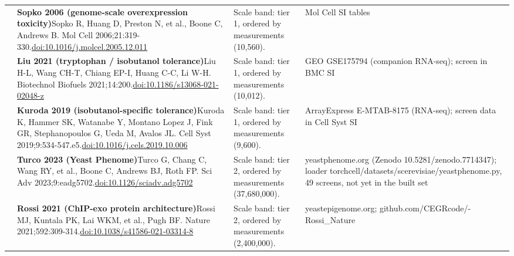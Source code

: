 \begin{landscape}
\begin{longtable}{@{}r@{\hspace{4pt}} L{86mm} L{92mm} L{62mm}@{}}
 & \textbf{Sopko 2006 (genome-scale overexpression toxicity)}\newline Sopko R, Huang D, Preston N, et al., Boone C, Andrews B. Mol Cell 2006;21:319-330.\newline \href{https://doi.org/10.1016/j.molcel.2005.12.011}{doi:10.1016/\allowbreak j.molcel.2005.12.011} & Scale band: tier 1, ordered by measurements (10,560). & Mol Cell SI tables \\
 & \textbf{Liu 2021 (tryptophan / isobutanol tolerance)}\newline Liu H-L, Wang CH-T, Chiang EP-I, Huang C-C, Li W-H. Biotechnol Biofuels 2021;14:200.\newline \href{https://doi.org/10.1186/s13068-021-02048-z}{doi:10.1186/\allowbreak s13068-021-02048-z} & Scale band: tier 1, ordered by measurements (10,012). & GEO GSE175794 (companion RNA-seq); screen in BMC SI \\
 & \textbf{Kuroda 2019 (isobutanol-specific tolerance)}\newline Kuroda K, Hammer SK, Watanabe Y, Montano Lopez J, Fink GR, Stephanopoulos G, Ueda M, Avalos JL. Cell Syst 2019;9:534-547.e5.\newline \href{https://doi.org/10.1016/j.cels.2019.10.006}{doi:10.1016/\allowbreak j.cels.2019.10.006} & Scale band: tier 1, ordered by measurements (9,600). & ArrayExpress E-MTAB-8175 (RNA-seq); screen data in Cell Syst SI \\
 & \textbf{Turco 2023 (Yeast Phenome)}\newline Turco G, Chang C, Wang RY, et al., Boone C, Andrews BJ, Roth FP. Sci Adv 2023;9:eadg5702.\newline \href{https://doi.org/10.1126/sciadv.adg5702}{doi:10.1126/\allowbreak sciadv.adg5702} & Scale band: tier 2, ordered by measurements (37,680,000). & yeastphenome.org (Zenodo 10.5281/\allowbreak zenodo.7714347); loader torchcell/\allowbreak datasets/\allowbreak scerevisiae/\allowbreak yeastphenome.py, 49 screens, not yet in the built set \\
 & \textbf{Rossi 2021 (ChIP-exo protein architecture)}\newline Rossi MJ, Kuntala PK, Lai WKM, et al., Pugh BF. Nature 2021;592:309-314.\newline \href{https://doi.org/10.1038/s41586-021-03314-8}{doi:10.1038/\allowbreak s41586-021-03314-8} & Scale band: tier 2, ordered by measurements (2,400,000). & yeastepigenome.org; github.com/\allowbreak CEGRcode/-Rossi\_Nature \\

\end{longtable}
\end{landscape}
